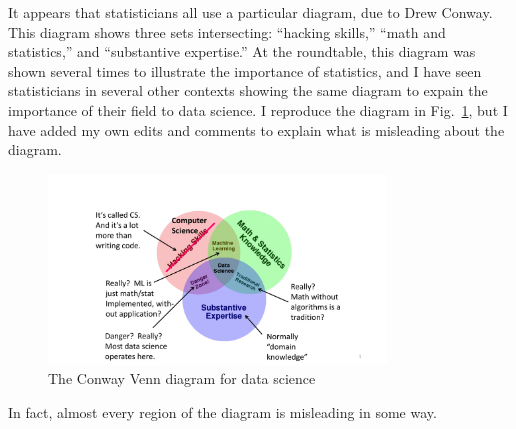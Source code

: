 \documentclass[11pt]{article}
\begin{document}
It appears that statisticians all use a particular diagram, due to Drew Conway.  This diagram shows three sets intersecting: ``hacking skills,'' ``math and statistics,'' and ``substantive expertise.''  At the roundtable, this diagram was shown several times to illustrate the importance of statistics, and I have seen statisticians in several other contexts showing the same diagram to expain the importance of their field to data science.  I reproduce the diagram in Fig.~\ref{drew-diagram-fig}, but I have added my own edits and comments to explain what is misleading about the diagram.

\begin{figure}[h]
\centerline{\includegraphics[width=0.8\textwidth]{drew-diagram.pdf}}
\caption{The Conway Venn diagram for data science}
\label{drew-diagram-fig}
\end{figure}

In fact, almost every region of the diagram is misleading in some way.
\end{document}
